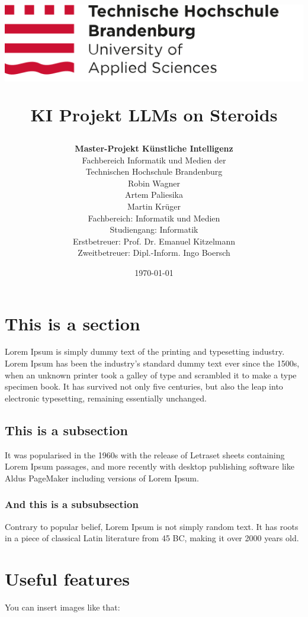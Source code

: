 \documentclass[12pt]{article}
\title {
	\begin{flushleft}
		\includegraphics[scale=0.5]{THB_Logo.png} \\[1.5cm]
	\end{flushleft}
	
	{KI Projekt LLMs on Steroids}
	
	\begin{center}
		
		\author{\textbf{Master-Projekt Künstliche Intelligenz} \\ Fachbereich Informatik und Medien der \\ Technischen Hochschule Brandenburg \\[1.8cm] Robin Wagner \\ Artem Paliesika \\ Martin Krüger \\ [1.8cm] Fachbereich: Informatik und Medien \\ Studiengang: Informatik \\[0.8cm] {Erstbetreuer: Prof. Dr. Emanuel Kitzelmann} \\ {Zweitbetreuer: Dipl.-Inform. Ingo Boersch} \\ [1.2cm]}
		
	\end{center}
}
\date{\today}
\begin{document}
	\maketitle
	\titlepage
	
	\begin{spacing}{1.225}
		\tableofcontents
	\end{spacing}
	\newpage
	
	\newpage
	
	\section{This is a section}
	
	\par Lorem Ipsum is simply dummy text of the printing and typesetting industry. Lorem Ipsum has been the industry's standard dummy text ever since the 1500s, when an unknown printer took a galley of type and scrambled it to make a type specimen book. It has survived not only five centuries, but also the leap into electronic typesetting, remaining essentially unchanged.\cite{loremIpsumRef}
	
	\subsection{This is a subsection}
	
	\par It was popularised in the 1960s with the release of Letraset sheets containing Lorem Ipsum passages, and more recently with desktop publishing software like Aldus PageMaker including versions of Lorem Ipsum.\cite{loremIpsumRef}

	
	\subsubsection{And this is a subsubsection}
	
	\par Contrary to popular belief, Lorem Ipsum is not simply random text. It has roots in a piece of classical Latin literature from 45 BC, making it over 2000 years old. \cite{loremIpsumRef}
	
	\section{Useful features}
	
	\par You can insert images like that:	
	
\end{document}
